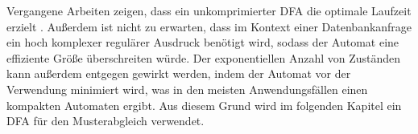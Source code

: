 Vergangene Arbeiten zeigen, dass ein unkomprimierter DFA die optimale Laufzeit erzielt \cite{Yu2013}.
Außerdem ist nicht zu erwarten, dass im Kontext einer Datenbankanfrage ein hoch komplexer regulärer Ausdruck benötigt wird, sodass der Automat eine effiziente Größe überschreiten würde.
Der exponentiellen Anzahl von Zuständen kann außerdem entgegen gewirkt werden, indem der Automat vor der Verwendung minimiert wird, was in den meisten Anwendungsfällen einen kompakten Automaten ergibt.
Aus diesem Grund wird im folgenden Kapitel ein DFA für den Musterabgleich verwendet.
